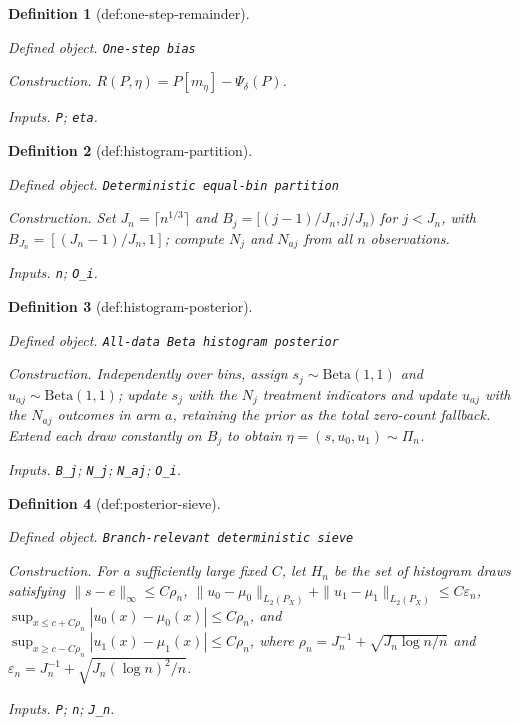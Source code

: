 \documentclass{article}
\newtheorem{definition}{Definition}
\begin{document}
\begin{definition}[def:one-step-remainder]\label{def:one-step-remainder}
\par\smallskip\noindent\emph{Defined object.} \texttt{One-\allowbreak{}step bias}
\par\smallskip\noindent\emph{Construction.} \(R(P,\eta)=P[m_\eta]-\Psi_\delta(P)\).
\par\smallskip\noindent\emph{Inputs.} \texttt{P}; \texttt{eta}.
\end{definition}

\begin{definition}[def:histogram-partition]\label{def:histogram-partition}
\par\smallskip\noindent\emph{Defined object.} \texttt{Deterministic equal-\allowbreak{}bin partition}
\par\smallskip\noindent\emph{Construction.} Set \(J_n=\lceil n^{1/3}\rceil\) and \(B_j=[(j-1)/J_n,j/J_n)\) for \(j<J_n\), with \(B_{J_n}=[(J_n-1)/J_n,1]\); compute \(N_j\) and \(N_{aj}\) from all \(n\) observations.
\par\smallskip\noindent\emph{Inputs.} \texttt{n}; \texttt{O\_\allowbreak{}i}.
\end{definition}

\begin{definition}[def:histogram-posterior]\label{def:histogram-posterior}
\par\smallskip\noindent\emph{Defined object.} \texttt{All-\allowbreak{}data Beta histogram posterior}
\par\smallskip\noindent\emph{Construction.} Independently over bins, assign \(s_j\sim\mathrm{Beta}(1,1)\) and \(u_{aj}\sim\mathrm{Beta}(1,1)\); update \(s_j\) with the \(N_j\) treatment indicators and update \(u_{aj}\) with the \(N_{aj}\) outcomes in arm \(a\), retaining the prior as the total zero-count fallback. Extend each draw constantly on \(B_j\) to obtain \(\eta=(s,u_0,u_1)\sim\Pi_n\).
\par\smallskip\noindent\emph{Inputs.} \texttt{B\_\allowbreak{}j}; \texttt{N\_\allowbreak{}j}; \texttt{N\_\allowbreak{}aj}; \texttt{O\_\allowbreak{}i}.
\end{definition}

\begin{definition}[def:posterior-sieve]\label{def:posterior-sieve}
\par\smallskip\noindent\emph{Defined object.} \texttt{Branch-\allowbreak{}relevant deterministic sieve}
\par\smallskip\noindent\emph{Construction.} For a sufficiently large fixed \(C\), let \(H_n\) be the set of histogram draws satisfying \(\|s-e\|_\infty\le C\rho_n\), \(\|u_0-\mu_0\|_{L_2(P_X)}+\|u_1-\mu_1\|_{L_2(P_X)}\le C\varepsilon_n\), \(\sup_{x\le c+C\rho_n}|u_0(x)-\mu_0(x)|\le C\rho_n\), and \(\sup_{x\ge c-C\rho_n}|u_1(x)-\mu_1(x)|\le C\rho_n\), where \(\rho_n=J_n^{-1}+\sqrt{J_n\log n/n}\) and \(\varepsilon_n=J_n^{-1}+\sqrt{J_n(\log n)^2/n}\).
\par\smallskip\noindent\emph{Inputs.} \texttt{P}; \texttt{n}; \texttt{J\_\allowbreak{}n}.
\end{definition}
\end{document}
